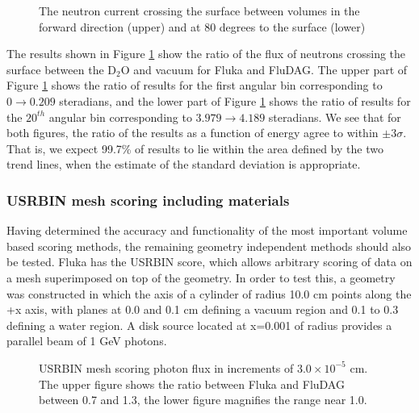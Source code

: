 \documentclass{anstrans}[12pt]
\begin{document}
\begin{figure}%
	\begin{center}
		\caption{The neutron current crossing the surface between volumes in the 
		forward direction (upper) and at 80 degrees to the surface (lower)}\label{fig:mat_usrbdx}
	\end{center}
\end{figure}

The results shown in Figure \ref{fig:mat_usrbdx} show the ratio of the
flux of neutrons crossing the surface between the D$_2$O and vacuum
for Fluka and FluDAG. The upper part of Figure \ref{fig:mat_usrbdx} shows
the ratio of results for the first angular bin corresponding to $0
\to 0.209$ steradians, and the lower part of Figure \ref{fig:mat_usrbdx}
shows the ratio of results for the $20^{th}$ angular bin corresponding to $3.979
\to 4.189$ steradians. We see that for both figures, the ratio of the
results as a function of energy agree to within $\pm 3\sigma$. That is, we
expect 99.7\% of results to lie within the area defined by the two
trend lines, when the estimate of the standard deviation is appropriate.

\subsubsection*{USRBIN mesh scoring including materials}
Having determined the accuracy and functionality of the most important 
volume based scoring methods, the remaining geometry independent methods
should also be tested.
Fluka has the USRBIN score, which allows arbitrary scoring
of data on a mesh superimposed on top of the geometry. In order to test this, a geometry
was constructed in which the axis of a cylinder of radius 10.0 cm points along the
+x axis, with planes at 0.0 and 0.1 cm defining a vacuum region and 0.1 to 0.3 
defining a water region. A disk source located at x=0.001 of radius provides a 
parallel beam of 1 GeV photons.

\begin{figure}%
	\begin{center}
		\caption{USRBIN mesh scoring photon flux in increments
                  of $3.0 \times 10^{-5}$ cm. The upper figure shows the ratio between
                  Fluka and FluDAG between 0.7 and 1.3, the lower
                  figure magnifies the range near 1.0. }\label{fig:mesh_phot}
	\end{center}
\end{figure}
\end{document}
